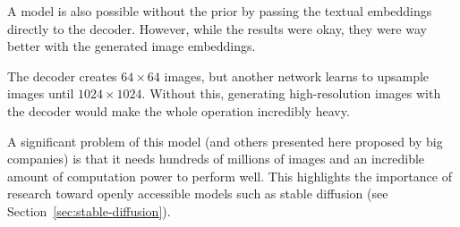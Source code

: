A model is also possible without the prior by passing the textual embeddings directly to the decoder. However, while the results were okay, they were way better with the generated image embeddings.

The decoder creates $64 \times 64$ images, but another network learns to upsample images until $1024 \times 1024$. Without this, generating high-resolution images with the decoder would make the whole operation incredibly heavy.

A significant problem of this model (and others presented here proposed by big companies) is that it needs hundreds of millions of images and an incredible amount of computation power to perform well. This highlights the importance of research toward openly accessible models such as stable diffusion (see Section~\ref{sec:stable-diffusion}).